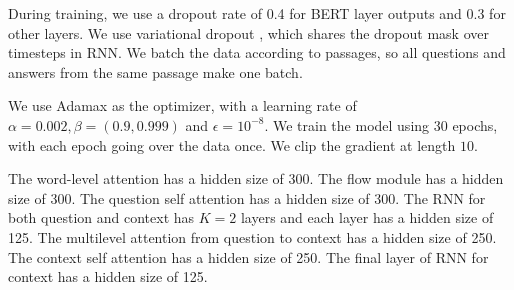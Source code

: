 \documentclass{article} \usepackage{sdnet,times}
\begin{document}
During training, we use a dropout rate of 0.4 for BERT layer outputs and 0.3 for other layers. We use variational dropout \citep{vd}, which shares the dropout mask over timesteps in RNN. We batch the data according to passages, so all questions and answers from the same passage make one batch. 

We use Adamax \citep{adamax} as the optimizer, with a learning rate of $\alpha=0.002, \beta=(0.9, 0.999)$ and $\epsilon=10^{-8}$. We train the model using 30 epochs, with each epoch going over the data once. We clip the gradient at length $10$.

The word-level attention has a hidden size of 300. The flow module has a hidden size of 300. The question self attention has a hidden size of 300. The RNN for both question and context has $K=2$ layers and each layer has a hidden size of 125. The multilevel attention from question to context has a hidden size of 250. The context self attention has a hidden size of 250. The final layer of RNN for context has a hidden size of 125.
\end{document}
